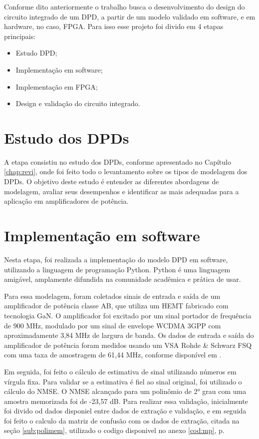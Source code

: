 Conforme dito anteriormente o trabalho busca o desenvolvimento do design do circuito integrado de um DPD, a partir de um modelo validado em software, e em hardware, no caso, FPGA. Para isso esse projeto foi divido em 4 etapas principais:

\begin{itemize}
    \item Estudo DPD;
    \item Implementação em software;
    \item Implementação em FPGA;
    \item Design e validação do circuito integrado.
\end{itemize}

\section{Estudo dos DPDs}
A etapa consistiu no estudo dos DPDs, conforme apresentado no Capítulo \ref{chap:revi}, onde foi feito todo o levantamento sobre os tipos de modelagem dos DPDs. O objetivo deste estudo é entender as diferentes abordagens de modelagem, avaliar seus desempenhos e identificar as mais adequadas para a aplicação em amplificadores de potência.

\section{Implementação em software}

Nesta etapa, foi realizada a implementação do modelo DPD em software, utilizando a linguagem de programação Python. Python é uma linguagem amigável, amplamente difundida na comunidade acadêmica e prática de usar.

Para essa modelagem, foram coletados sinais de entrada e saída de um amplificador de potência classe AB, que utiliza um HEMT fabricado com tecnologia GaN. O amplificador foi excitado por um sinal portador de frequência de 900 MHz, modulado por um sinal de envelope WCDMA 3GPP com aproximadamente 3,84 MHz de largura de banda. Os dados de entrada e saída do amplificador de potência foram medidos usando um VSA Rohde & Schwarz FSQ com uma taxa de amostragem de 61,44 MHz, conforme disponível em \cite{Bonfim2016}.

Em seguida, foi feito o cálculo de estimativa de sinal utilizando números em vírgula fixa. Para validar se a estimativa é fiel ao sinal original, foi utilizado o cálculo do NMSE. O NMSE alcançado para um polinômio de 2° grau com uma amostra memorizada foi de -23,57 dB. Para realizar essa validação, inicialmente foi divido od dados disponiel entre dados de extração e validação, e em seguida foi feito o calculo da matriz de confusão com os dados de extração, citada na seção \ref{sub:polimem},  utilizado o codigo disponivel no anexo \ref{cod:mp}, p. 


